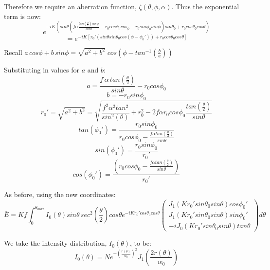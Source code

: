 \documentclass{article}
\begin{document}
    Therefore we require an aberration function, \(\zeta(\theta,\phi,\alpha)\). Thus the exponential term is now:
    \[e^{-iK(sin\theta(f\alpha \frac{tan\left(\frac{\theta}{2}\right)cos\phi}{sin\theta} - r_0 cos\phi_0 cos_\phi - r_0 sin\phi_0 sin\phi)sin\theta_0 + r_0 cos\theta_0 cos\theta)}\]
    \[= e^{-iK[r_0'(sin\theta sin\theta_0 cos(\phi - \phi_0'))+r_0 cos\theta_0 cos\theta]}\]
    
    Recall \(a\,cos\phi + b\,sin\phi = \sqrt{a^2 + b^2} \; cos\left(\phi - tan^{-1}\left(\frac{b}{a}\right)\right)\)

    Substituting in values for \(a\) and \(b\):
    \[a = \frac{f\,\alpha\,tan\left(\frac{\theta}{2}\right)}{sin\theta} - r_0 cos\phi_0\]
    \[b = -r_0 sin\phi_0\]
    \[r_0' = \sqrt{a^2 + b^2} = \sqrt{\frac{f^2 \alpha^2 tan^2}{sin^2(\theta)}+r_0^2 - 2f\alpha r_0 cos\phi_0 \frac{tan\left(\frac{\theta}{2}\right)}{sin\theta}}\]
    \[tan(\phi_0') = \frac{r_0 sin\phi_0}{r_0 cos\phi_0 - \frac{f \alpha tan\left(\frac{\theta}{2}\right)}{sin\theta}}\]
    \[sin(\phi_0') = \frac{r_0 sin\phi_0}{r_0'}\]
    \[cos(\phi_0') = \frac{(r_0 cos\phi_0 - \frac{f \alpha tan\left(\frac{\theta}{2}\right)}{sin\theta})}{r_0'}\]

    As before, using the new coordinates:
    \[\bar{E} = Kf \int_0^{\theta_{max}} I_0(\theta) sin\theta \, sec^2\left(\frac{\theta}{2}\right) cos\theta e^{-iK r_0' cos\theta_0 cos\theta} \begin{pmatrix} J_1(Kr_0' sin\theta_0 sin\theta)cos\phi_0' \\ J_1(Kr_0' sin\theta_0sin\theta)sin\phi_0' \\ -i J_0(Kr_0' sin\theta_0sin\theta)tan\theta \end{pmatrix} d\theta \]

    We take the intensity distribution, \(I_0(\theta)\), to be:
    \[I_0(\theta) = Ne^{-\left(\frac{r(\theta)}{w_0}\right)^2} J_1\left(\frac{2r(\theta)}{w_0}\right)\]
\end{document}
